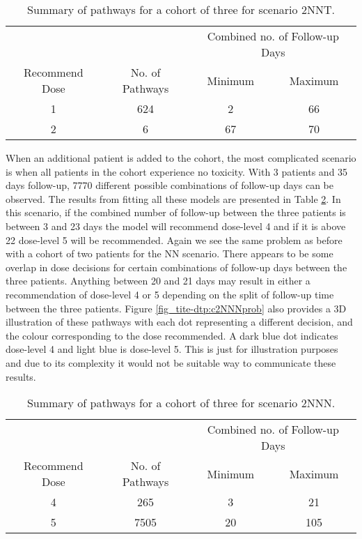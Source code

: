 \begin{table}[H]
	\centering
	\caption{Summary of pathways for a cohort of three for scenario 2NNT. }
	\label{tab_tite-dtp:TITEDTP_c3NNT}
	\begin{tabular}{cccc}
		\hline
		\multicolumn{1}{l}{} & \multicolumn{1}{l}{} & \multicolumn{2}{c}{Combined no. of Follow-up Days} \\ \cline{3-4} 
		Recommend Dose & No. of Pathways & Minimum & Maximum \\ \hline
		1              & 624             & 2       & 66      \\
		2              & 6               & 67      & 70      \\ \hline
	\end{tabular}
\end{table}

When an additional patient is added to the cohort, the most complicated scenario is when all patients in the cohort experience no toxicity. With 3 patients and 35 days follow-up, 7770 different possible combinations of follow-up days can be observed. The results from fitting all these models are presented in Table \ref{tab_tite-dtp:TITEDTP_c3NNN}. In this scenario, if the combined number of follow-up between the three patients is between 3 and 23 days the model will recommend dose-level 4 and if it is above 22 dose-level 5 will be recommended. Again we see the same problem as before with a cohort of two patients for the NN scenario. There appears to be some overlap in dose decisions for certain combinations of follow-up days between the three patients. Anything between 20 and 21 days may result in either a recommendation of dose-level 4 or 5 depending on the split of follow-up time between the three patients. Figure \ref{fig_tite-dtp:c2NNNprob} also provides a 3D illustration of these pathways with each dot representing a different decision, and the colour corresponding to the dose recommended. A dark blue dot indicates dose-level 4 and light blue is dose-level 5. This is just for illustration purposes and due to its complexity it would not be suitable way to communicate these results.   

\begin{table}[H]
	\centering
	\caption{Summary of pathways for a cohort of three for scenario 2NNN.}
	\label{tab_tite-dtp:TITEDTP_c3NNN}
	\begin{tabular}{cccc}
		\hline
		\multicolumn{1}{l}{} & \multicolumn{1}{l}{} & \multicolumn{2}{c}{Combined no. of Follow-up Days} \\ \cline{3-4} 
		Recommend Dose & No. of Pathways & Minimum & Maximum \\ \hline
		4              & 265             & 3       & 21      \\
		5              & 7505            & 20      & 105      \\ \hline
	\end{tabular}
\end{table}

